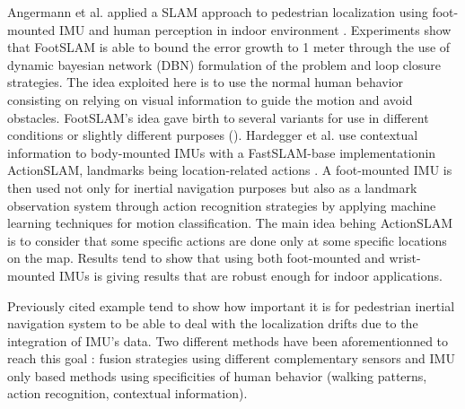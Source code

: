 Angermann et al. applied a SLAM approach to pedestrian localization using foot-mounted IMU and human perception in indoor environment \cite{angermann2012footslam}. Experiments show that
FootSLAM is able to bound the error growth to 1 meter through the use of dynamic bayesian network (DBN) formulation of the problem and loop closure strategies. The idea exploited here is to use the normal human behavior 
consisting on relying on visual information to guide the motion and avoid obstacles. FootSLAM's idea gave birth to several variants for use in different conditions or slightly different purposes (\cite{puyol2012complexity,bruno2011wislam}).
Hardegger et al. use contextual information to body-mounted IMUs with a FastSLAM-base implementationin ActionSLAM, landmarks being location-related actions \cite{hardegger2012actionslam}. 
A foot-mounted IMU is then used not only for inertial navigation purposes but also as a landmark observation system through action recognition strategies by applying machine learning techniques for motion classification.
The main idea behing ActionSLAM is to consider that some specific actions are done only at some specific locations on the map. Results tend to show that using both foot-mounted and wrist-mounted IMUs
is giving results that are robust enough for indoor applications.


Previously cited example tend to show how important it is for pedestrian inertial navigation system to be able to deal with the localization drifts due to the integration of IMU's data. 
Two different methods have been aforementionned to reach this goal : fusion strategies using different complementary sensors and IMU only based methods using specificities
of human behavior (walking patterns, action recognition, contextual information).


